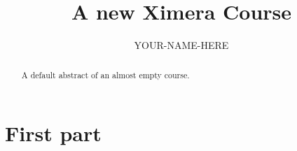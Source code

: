 \documentclass{xourse}
\title{A new Ximera Course}
\author{YOUR-NAME-HERE}
\begin{document}
\begin{abstract}
    A default abstract of an almost empty course.
\end{abstract}
\maketitle

\part{First part}

\end{document}
